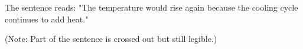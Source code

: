 The sentence reads:  
"The temperature would rise again because the cooling cycle continues to add heat."  

(Note: Part of the sentence is crossed out but still legible.)